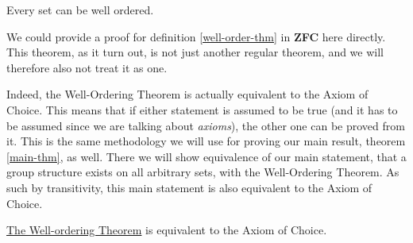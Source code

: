 \documentclass[../../main.tex]{subfiles}
\begin{document}
\begin{definition}\cite[Theorem 15, p.39]{Jec78}\label{well-order-thm}
    \newline Every set can be well ordered.
\end{definition}

We could provide a proof for definition \ref{well-order-thm} in \textbf{ZFC} here directly.
This theorem, as it turn out, is not just another regular theorem, and we will therefore also not treat it as one.

Indeed, the Well-Ordering Theorem is actually equivalent to the Axiom of Choice.
This means that if either statement is assumed to be true (and it has to be assumed since we are talking about \textit{axioms}),
the other one can be proved from it.
This is the same methodology we will use for proving our main result, theorem \ref{main-thm}, as well.
There we will show equivalence of our main statement, that a group structure exists on all arbitrary sets, with the Well-Ordering Theorem.
As such by transitivity, this main statement is also equivalent to the Axiom of Choice.

\begin{theorem}
    \hyperref[well-order-thm]{The Well-ordering Theorem} is equivalent to the Axiom of Choice. %
\end{theorem}
\end{document}
